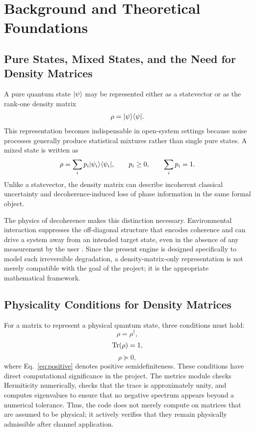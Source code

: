 \chapter{Background and Theoretical Foundations}

\section{Pure States, Mixed States, and the Need for Density Matrices}

A pure quantum state $\lvert \psi \rangle$ may be represented either as a statevector or as the rank-one density matrix
\begin{equation}
\rho = \lvert \psi \rangle \langle \psi \rvert.
\label{eq:pure_density}
\end{equation}
This representation becomes indispensable in open-system settings because noise processes generally produce statistical mixtures rather than single pure states. A mixed state is written as
\begin{equation}
\rho = \sum_i p_i \lvert \psi_i \rangle \langle \psi_i \rvert,
\qquad
p_i \ge 0,
\qquad
\sum_i p_i = 1.
\label{eq:mixed_density}
\end{equation}
Unlike a statevector, the density matrix can describe incoherent classical uncertainty and decoherence-induced loss of phase information in the same formal object.

The physics of decoherence makes this distinction necessary. Environmental interaction suppresses the off-diagonal structure that encodes coherence and can drive a system away from an intended target state, even in the absence of any measurement by the user \cite{zurek2003decoherence}. Since the present engine is designed specifically to model such irreversible degradation, a density-matrix-only representation is not merely compatible with the goal of the project; it is the appropriate mathematical framework.

\section{Physicality Conditions for Density Matrices}

For a matrix to represent a physical quantum state, three conditions must hold:
\begin{equation}
\rho = \rho^\dagger,
\label{eq:hermitian}
\end{equation}
\begin{equation}
\operatorname{Tr}(\rho) = 1,
\label{eq:trace_one}
\end{equation}
\begin{equation}
\rho \succeq 0,
\label{eq:positive}
\end{equation}
where Eq.~\eqref{eq:positive} denotes positive semidefiniteness. These conditions have direct computational significance in the project. The metrics module checks Hermiticity numerically, checks that the trace is approximately unity, and computes eigenvalues to ensure that no negative spectrum appears beyond a numerical tolerance. Thus, the code does not merely compute on matrices that are assumed to be physical; it actively verifies that they remain physically admissible after channel application.

